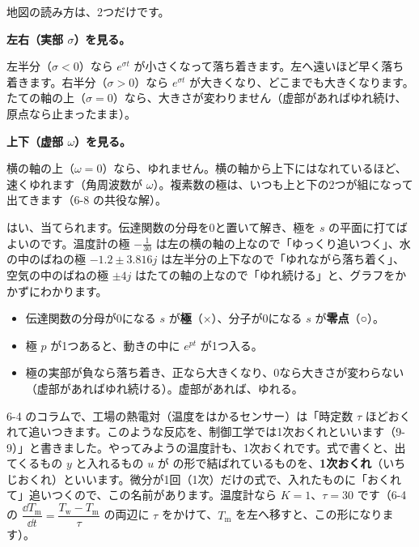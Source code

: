 地図の読み方は、2つだけです。
\begin{enumerate}[label={\bkcircled[\bkTT]{\arabic*}}, leftmargin=2.4\zw, itemsep=2pt, topsep=2pt]
\item \textbf{左右（実部 $\sigma$）を見る。}\par\nobreak\noindent 左半分（$\sigma<0$）なら $e^{\sigma t}$ が小さくなって落ち着きます。左へ遠いほど早く落ち着きます。右半分（$\sigma>0$）なら $e^{\sigma t}$ が大きくなり、どこまでも大きくなります。たての軸の上（$\sigma=0$）なら、大きさが変わりません（虚部があればゆれ続け、原点なら止まったまま）。
\item \textbf{上下（虚部 $\omega$）を見る。}\par\nobreak\noindent 横の軸の上（$\omega=0$）なら、ゆれません。横の軸から上下にはなれているほど、速くゆれます（角周波数が $\omega$）。複素数の極は、いつも上と下の2つが組になって出てきます（6-8 の共役な解）。
\end{enumerate}

はい、当てられます。伝達関数の分母を0と置いて解き、極を $s$ の平面に打てばよいのです。温度計の極 $-\frac{1}{30}$ は左の横の軸の上なので「ゆっくり追いつく」、水の中のばねの極 $-1.2\pm3.816j$ は左半分の上下なので「ゆれながら落ち着く」、空気の中のばねの極 $\pm4j$ はたての軸の上なので「ゆれ続ける」と、グラフをかかずにわかります。

\begin{taisetsu}
\begin{itemize}[leftmargin=1.2\zw, itemsep=2pt, topsep=0pt, label={\color{\bkTT}●}]
\item 伝達関数の分母が0になる $s$ が\textbf{極}（×）、分子が0になる $s$ が\textbf{零点}（○）。
\item 極 $p$ が1つあると、動きの中に $e^{pt}$ が1つ入る。
\item 極の実部が負なら落ち着き、正なら大きくなり、0なら大きさが変わらない（虚部があればゆれ続ける）。虚部があれば、ゆれる。
\end{itemize}
\end{taisetsu}



\label{bk:9-9:ichiji}6-4 のコラムで、工場の熱電対（温度をはかるセンサー）は「時定数 $\tau$ ほどおくれて追いつきます。このような反応を、制御工学では1次おくれといいます（9-9）」と書きました。やってみようの温度計も、1次おくれです。式で書くと、出てくるもの $y$ と入れるもの $u$ が
の形で結ばれているものを、\textbf{1次おくれ}（いちじおくれ）といいます。微分が1回（1次）だけの式で、入れたものに「おくれて」追いつくので、この名前があります。温度計なら $K=1$、$\tau=30$ です（6-4 の $\dfrac{\dd T_{\mathrm m}}{\dd t}=\dfrac{T_{\mathrm w}-T_{\mathrm m}}{\tau}$ の両辺に $\tau$ をかけて、$T_{\mathrm m}$ を左へ移すと、この形になります）。


